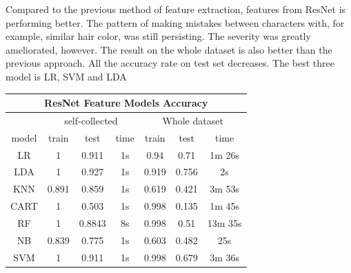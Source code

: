 \documentclass[11.5pt]{article}
\begin{document}
\begin{enumerate}
\begin{itemize}
            \vspace{3mm}
            \begin{minipage}{0.35\textwidth}
                Compared to the previous method of feature extraction, features from ResNet is performing better.
                The pattern of making mistakes between characters with, for example, similar hair color, was still persisting.
                The severity was greatly ameliorated, however.
                The result on the whole dataset is also better than the previous approach.
                All the accuracy rate on test set decreases.
                The best three model is LR, SVM and LDA
            \end{minipage}
            \begin{minipage}{0.5\textwidth}
                \begin{tabular}{|c|c|c|c|c|c|c|}
                    \multicolumn{7}{c}{\textbf{ResNet Feature Models Accuracy} }\\
                    \hline
                    & \multicolumn{3}{|c|}{self-collected} & \multicolumn{3}{|c|}{Whole dataset} \\ \hline
                    model & train & test & time & train & test & time \\ \hline
                    LR & 1 & 0.911 & 1s & 0.94 & 0.71 & 1m 26s \\ \hline
                    LDA & 1 & 0.927 & 1s & 0.919 & 0.756 & 2s \\ \hline
                    KNN & 0.891 & 0.859 & 1s & 0.619 & 0.421 & 3m 53s \\ \hline
                    CART & 1 & 0.503 & 1s & 0.998 & 0.135 & 1m 45s \\ \hline
                    RF & 1 & 0.8843 & 8s & 0.998 & 0.51 & 13m 35s\\ \hline
                    NB & 0.839 & 0.775 & 1s & 0.603 & 0.482 & 25s \\ \hline
                    SVM & 1 & 0.911 & 1s & 0.998 & 0.679 & 3m 36s \\ \hline
                \end{tabular}
            \end{minipage}



\end{itemize}
\end{enumerate}
\end{document}
